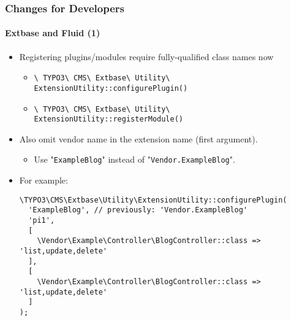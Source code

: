 
\begin{frame}[fragile]
	\frametitle{Changes for Developers}
	\framesubtitle{Extbase and Fluid (1)}

	\lstset{basicstyle=\tiny\ttfamily}

	\begin{itemize}
		\item Registering plugins/modules require fully-qualified class names now

			\begin{itemize}\smaller
				\item \texttt{\textbackslash
					TYPO3\textbackslash
					CMS\textbackslash
					Extbase\textbackslash
					Utility\textbackslash
					ExtensionUtility::configurePlugin()}
				\item \texttt{\textbackslash
					TYPO3\textbackslash
					CMS\textbackslash
					Extbase\textbackslash
					Utility\textbackslash
					ExtensionUtility::registerModule()}
			\end{itemize}\normalsize

		\item Also omit vendor name in the extension name (first argument).

			\begin{itemize}\smaller
				\item[\ding{228}] Use "\texttt{ExampleBlog}" instead of "\texttt{Vendor.ExampleBlog}".
			\end{itemize}

		\item For example:

\begin{lstlisting}
\TYPO3\CMS\Extbase\Utility\ExtensionUtility::configurePlugin(
  'ExampleBlog', // previously: 'Vendor.ExampleBlog'
  'pi1',
  [
    \Vendor\Example\Controller\BlogController::class => 'list,update,delete'
  ],
  [
    \Vendor\Example\Controller\BlogController::class => 'list,update,delete'
  ]
);
\end{lstlisting}

	\end{itemize}

\end{frame}


